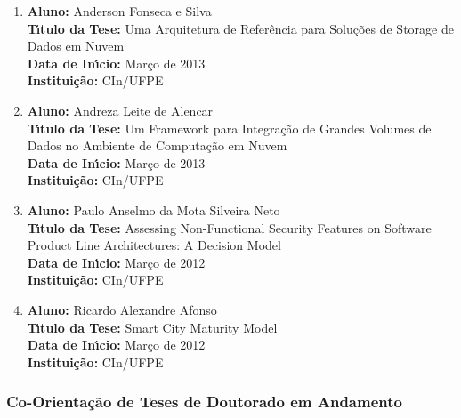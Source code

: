 \documentclass[a4paper,oneside,10pt]{article}
\begin{document}
\begin{enumerate}
\item       \textbf{Aluno:} Anderson Fonseca e Silva \mbox{} \\
            \textbf{T\'{\i}tulo da Tese:}  Uma Arquitetura de Refer\^{e}ncia para Solu\c{c}\~{o}es de Storage de Dados em Nuvem\\
            \textbf{Data de In\'{\i}cio:} Mar\c{c}o de 2013 \\
            \textbf{Institui\c{c}\~{a}o:} CIn/UFPE

\item       \textbf{Aluno:} Andreza Leite de Alencar \mbox{} \\
            \textbf{T\'{\i}tulo da Tese:} Um Framework para Integração de Grandes Volumes de Dados no Ambiente de Computação em Nuvem \\
            \textbf{Data de In\'{\i}cio:} Mar\c{c}o de 2013 \\
            \textbf{Institui\c{c}\~{a}o:} CIn/UFPE

\item       \textbf{Aluno:} Paulo Anselmo da Mota Silveira Neto \mbox{} \\
            \textbf{T\'{\i}tulo da Tese:} Assessing Non-Functional Security Features on Software Product Line Architectures: A Decision Model \\
            \textbf{Data de In\'{\i}cio:} Mar\c{c}o de 2012 \\
            \textbf{Institui\c{c}\~{a}o:} CIn/UFPE

\item       \textbf{Aluno:} Ricardo Alexandre Afonso \mbox{} \\
            \textbf{T\'{\i}tulo da Tese:} Smart City Maturity Model \\
            \textbf{Data de In\'{\i}cio:} Mar\c{c}o de 2012 \\
            \textbf{Institui\c{c}\~{a}o:} CIn/UFPE

\end{enumerate}


\subsubsection{Co-Orienta\c{c}\~{a}o de Teses de Doutorado em Andamento}
\vspace{0.3cm}
\end{document}

